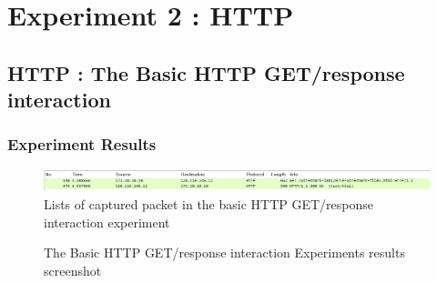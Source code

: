 \section{Experiment 2 : HTTP}
\subsection{HTTP : The Basic HTTP GET/response interaction}
    \subsubsection*{Experiment Results}
     \vspace{-4mm}
    	\begin{figure}[!h]
    		\centering
    			\includegraphics[width=.9\textwidth]{image/week01/2-1.png}
    			\caption{\small Lists of captured packet in the basic HTTP GET/response interaction experiment}
    	\end{figure}
    \vspace{-4mm}  
        \begin{figure}[!h]
            \centering
            \hfill
            \caption{The Basic HTTP GET/response interaction Experiments results screenshot}
        \end{figure}
    \vspace{-4mm}
